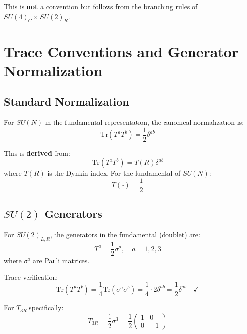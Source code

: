 \documentclass[11pt,a4paper]{article}
\begin{document}
This is \textbf{not} a convention but follows from the branching rules of $SU(4)_C \times SU(2)_R$.

\section{Trace Conventions and Generator Normalization}
\label{sec:trace}

\subsection{Standard Normalization}
\label{subsec:standard-norm}

For $SU(N)$ in the fundamental representation, the canonical normalization is:
\begin{equation}
\label{eq:trace-convention}
\mathrm{Tr}(T^a T^b) = \frac{1}{2} \delta^{ab}
\end{equation}

This is \textbf{derived} from:
\begin{equation}
\label{eq:trace-derivation}
\mathrm{Tr}(T^a T^b) = T(R) \delta^{ab}
\end{equation}
where $T(R)$ is the Dynkin index. For the fundamental of $SU(N)$:
\begin{equation}
\label{eq:dynkin-fund}
T(\square) = \frac{1}{2}
\end{equation}

\subsection{$SU(2)$ Generators}
\label{subsec:su2-generators}

For $SU(2)_{L,R}$, the generators in the fundamental (doublet) are:
\begin{equation}
\label{eq:su2-generators}
T^a = \frac{1}{2} \sigma^a, \quad a = 1,2,3
\end{equation}
where $\sigma^a$ are Pauli matrices.

Trace verification:
\begin{equation}
\label{eq:su2-trace-verify}
\mathrm{Tr}(T^a T^b) = \frac{1}{4} \mathrm{Tr}(\sigma^a \sigma^b) = \frac{1}{4} \cdot 2 \delta^{ab} = \frac{1}{2} \delta^{ab} \quad \checkmark
\end{equation}

For $T_{3R}$ specifically:
\begin{equation}
\label{eq:t3r-explicit}
T_{3R} = \frac{1}{2} \sigma^3 = \frac{1}{2} \begin{pmatrix} 1 & 0 \\ 0 & -1 \end{pmatrix}
\end{equation}
\end{document}
